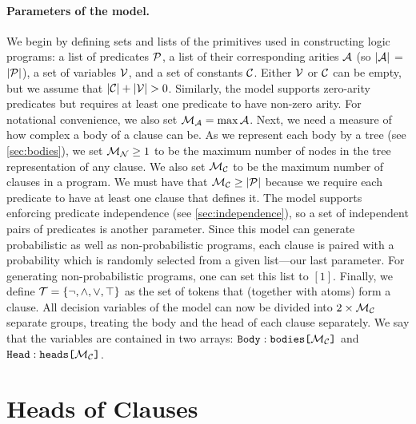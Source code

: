 \paragraph*{Parameters of the model.} We begin by defining sets and lists of the
primitives used in constructing logic programs: a list of predicates
$\predicates{}$, a list of their corresponding arities $\arities{}$ (so
$|\arities{}|$ = $|\predicates{}|$), a set of variables $\variables{}$, and a
set of constants $\constants{}$. Either $\variables{}$ or $\constants{}$ can be
empty, but we assume that $|\constants{}| + |\variables{}| > 0$. Similarly, the
model supports zero-arity predicates but requires at least one predicate to have
non-zero arity. For notational convenience, we also set $\maxArity{} = \max
\arities{}$. Next, we need a measure of how complex a body of a clause can be.
As we represent each body by a tree (see \cref{sec:bodies}), we set
$\maxNumNodes{} \ge 1$ to be the maximum number of nodes in the tree
representation of any clause. We also set $\maxNumClauses{}$ to be the maximum
number of clauses in a program. We must have that $\maxNumClauses{} \ge
|\predicates{}|$ because we require each predicate to have at least one clause
that defines it. The model supports enforcing predicate independence (see
\cref{sec:independence}), so a set of independent pairs of predicates is another
parameter. Since this model can generate probabilistic as well as
non-probabilistic programs, each clause is paired with a probability which is
randomly selected from a given list---our last parameter. For generating
non-probabilistic programs, one can set this list to $[1]$. Finally, we define
$\tokens{} = \{ \neg, \land, \lor, \top \}$ as the set of tokens that (together
with atoms) form a clause. All decision variables of the model can now be
divided into $2 \times \maxNumClauses{}$ separate groups, treating the body and
the head of each clause separately. We say that the variables are contained in
two arrays: $\arrayt{bodies}{\maxNumClauses{}}{Body}$ and
$\arrayt{heads}{\maxNumClauses{}}{Head}$.

\section{Heads of Clauses} \label{sec:heads}


